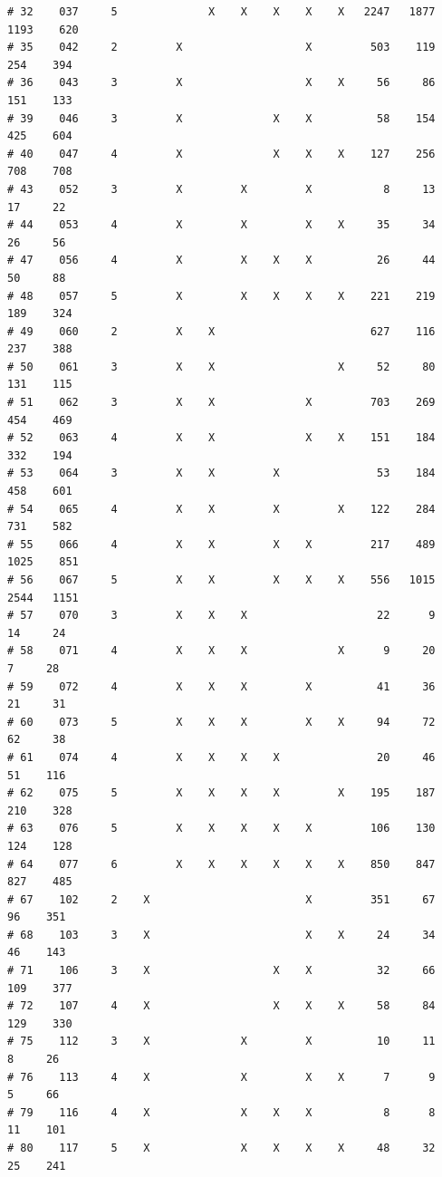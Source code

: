 \documentclass{article}\usepackage[]{graphicx}\usepackage[]{color}
\makeatletter
\newenvironment{kframe}{%
 \def\at@end@of@kframe{}%
 \ifinner\ifhmode%
  \def\at@end@of@kframe{\end{minipage}}%
  \begin{minipage}{\columnwidth}%
 \fi\fi%
 \def\FrameCommand##1{\hskip\@totalleftmargin \hskip-\fboxsep
 \colorbox{shadecolor}{##1}\hskip-\fboxsep
     \hskip-\linewidth \hskip-\@totalleftmargin \hskip\columnwidth}%
 \MakeFramed {\advance\hsize-\width
   \@totalleftmargin\z@ \linewidth\hsize
   \@setminipage}}%
 {\par\unskip\endMakeFramed%
 \at@end@of@kframe}
\newenvironment{knitrout}{}{} %
\makeatother
\begin{document}
\begin{knitrout}
\begin{kframe}
\begin{verbatim}
# 32    037     5              X    X    X    X    X   2247   1877   1193    620
# 35    042     2         X                   X         503    119    254    394
# 36    043     3         X                   X    X     56     86    151    133
# 39    046     3         X              X    X          58    154    425    604
# 40    047     4         X              X    X    X    127    256    708    708
# 43    052     3         X         X         X           8     13     17     22
# 44    053     4         X         X         X    X     35     34     26     56
# 47    056     4         X         X    X    X          26     44     50     88
# 48    057     5         X         X    X    X    X    221    219    189    324
# 49    060     2         X    X                        627    116    237    388
# 50    061     3         X    X                   X     52     80    131    115
# 51    062     3         X    X              X         703    269    454    469
# 52    063     4         X    X              X    X    151    184    332    194
# 53    064     3         X    X         X               53    184    458    601
# 54    065     4         X    X         X         X    122    284    731    582
# 55    066     4         X    X         X    X         217    489   1025    851
# 56    067     5         X    X         X    X    X    556   1015   2544   1151
# 57    070     3         X    X    X                    22      9     14     24
# 58    071     4         X    X    X              X      9     20      7     28
# 59    072     4         X    X    X         X          41     36     21     31
# 60    073     5         X    X    X         X    X     94     72     62     38
# 61    074     4         X    X    X    X               20     46     51    116
# 62    075     5         X    X    X    X         X    195    187    210    328
# 63    076     5         X    X    X    X    X         106    130    124    128
# 64    077     6         X    X    X    X    X    X    850    847    827    485
# 67    102     2    X                        X         351     67     96    351
# 68    103     3    X                        X    X     24     34     46    143
# 71    106     3    X                   X    X          32     66    109    377
# 72    107     4    X                   X    X    X     58     84    129    330
# 75    112     3    X              X         X          10     11      8     26
# 76    113     4    X              X         X    X      7      9      5     66
# 79    116     4    X              X    X    X           8      8     11    101
# 80    117     5    X              X    X    X    X     48     32     25    241

\end{verbatim}
\end{kframe}
\end{knitrout}
\end{document}
